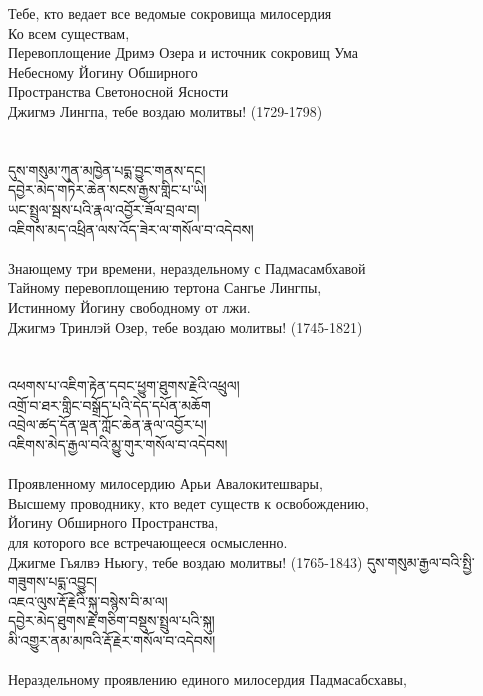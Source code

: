 \ru
Тебе, кто ведает все ведомые сокровища милосердия\\
Ко всем существам,\\
Перевоплощение Дримэ Озера и источник сокровищ Ума \\
Небесному Йогину Обширного \\
Пространства Светоносной Ясности\\
Джигмэ Лингпа, тебе воздаю молитвы! (1729-1798)\\
\\
\\
\ti
དུས་གསུམ་ཀུན་མཁྱེན་པདྨ་བྱུང་གནས་དང། \\
དབྱེར་མེད་གཏེར་ཆེན་སངས་རྒྱས་གླིང་པ་ཡི།\\
ཡང་སྤྲུལ་སྦས་པའི་རྣལ་འབྱོར་ཟོལ་བྲལ་བ།\\
འཇིགས་མད་འཕྲིན་ལས་འོད་ཟེར་ལ་གསོལ་བ་འདེབས།\\
\\
\ru
Знающему три времени, нераздельному с Падмасамбхавой\\
Тайному перевоплощению тертона Сангье Лингпы,\\
Истинному Йогину свободному от лжи.\\
Джигмэ Тринлэй Озер, тебе воздаю молитвы! (1745-1821)\\
\\
\\
\ti
འཕགས་པ་འཇིག་རྟེན་དབང་ཕྱུག་ཐུགས་རྗེའི་འཕྲུལ། \\
འགྲོ་བ་ཐར་གླིང་བསྒྲོད་པའི་དེད་དཔོན་མཆོག \\
འབྲེལ་ཚད་དོན་ལྡན་ཀློང་ཆེན་རྣལ་འབྱོར་པ། \\
འཇིགས་མེད་རྒྱལ་བའི་མྱུ་གུར་གསོལ་བ་འདེབས།\\
\\
\ru
Проявленному милосердию Арьи Авалокитешвары,\\
Высшему проводнику, кто ведет существ к освобождению,\\
Йогину Обширного Пространства,\\
для которого все встречающееся осмысленно.\\
Джигме Гьялвэ Ньюгу, тебе воздаю молитвы! (1765-1843)
\newpage
\ti
དུས་གསུམ་རྒྱལ་བའི་སྤྱི་གཟུགས་པདྨ་འབྱུང། \\
འཇའ་ལུས་རྡོ་རྗེའི་སྐུ་བསྙེས་བི་མ་ལ། \\
དབྱེར་མེད་ཐུགས་རྗེ་གཅིག་བསྡུས་སྤྲུལ་པའི་སྐུ། \\
མི་འགྱུར་ནམ་མཁའི་རྡོ་རྗེར་གསོལ་བ་འདེབས།\\
\\
\ru
Нераздельному проявлению единого милосердия Падмасабсхавы,\\
